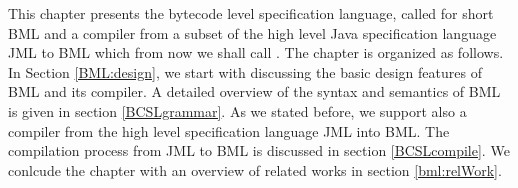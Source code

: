 
%

\newcommand{\code}{\textit{code}}
\newcommand{\indexComp}{\textit{index}}





This chapter presents the bytecode level specification language, called for short BML and a compiler from a
 subset of the high level Java specification language JML to BML which from now we shall call \JMLtoBML. 
The chapter is organized as follows.
In Section \ref{BML:design}, we start with discussing the basic design features of BML and its compiler. 
 A detailed overview of the syntax and semantics of BML is given in section \ref{BCSLgrammar}.  
  As we stated before, we support also a compiler from the high level specification language JML into BML. The 
 compilation process from JML to BML is discussed in section  \ref{BCSLcompile}.
 We conlcude the chapter with an overview of related works in section \ref{bml:relWork}. 




